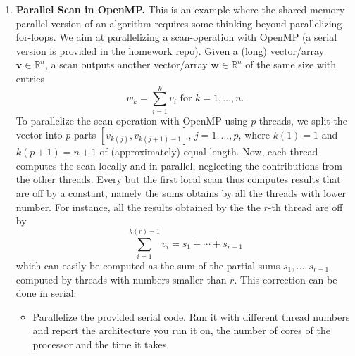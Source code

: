 \documentclass[12pt]{article}
\newcommand{\bs}{\boldsymbol}
\begin{document}
\begin{enumerate}
    {\bf Extra credit:} develop an efficient way to evaluate the
    function outside of the interval $x\in[-\pi/4,\pi/4]$ using
    symmetries.  Explain
    your idea in words and implement it for the function
    \texttt{sin4\_taylor()} and for any one vectorized version.
    Hint: $e^{i \theta} = \cos \theta + i \sin \theta$
    ~~and~~ $e^{i(\theta+\pi/2)} = i e^{i \theta}$.
  \item {\bf Parallel Scan in OpenMP.} This is an example where the
    shared memory parallel version of an algorithm requires some
    thinking beyond parallelizing for-loops. We aim at parallelizing a
    scan-operation with OpenMP (a serial version is provided in the
    homework repo). Given a (long) vector/array $\bs v\in \mathbb
    R^n$, a scan outputs another vector/array $\bs w\in \mathbb R^n$ of
    the same size with entries
    $$
    w_k = \sum_{i=1}^k v_i \text{ for } k=1,\ldots,n.
    $$
    To parallelize the scan operation with OpenMP using $p$ threads,
    we split the vector into $p$ parts $[v_{k(j)},v_{k(j+1)-1}]$,
    $j=1,\ldots,p$, where $k(1)=1$ and $k(p+1)=n+1$ of (approximately)
    equal length. Now, each thread computes the scan locally and in
    parallel, neglecting the contributions from the other threads.
    Every but the first local scan thus computes results that are off
    by a constant, namely the sums obtains by all the threads with
    lower number.  For instance, all the results obtained by the
    the $r$-th thread are off by
    $$
    \sum_{i=1}^{k(r)-1} v_i = s_1 + \cdots + s_{r-1}
    $$
    which can easily be computed as the sum of the partial sums
    $s_1,\ldots,s_{r-1}$ computed by threads with numbers smaller than
    $r$.  This correction can be done in serial.
    \begin{itemize}
    \item Parallelize the provided serial code. Run it with different
      thread numbers and report the architecture you run it on, the
      number of cores of the processor and the time it takes.
    \end{itemize}
\end{enumerate}
\end{document}
